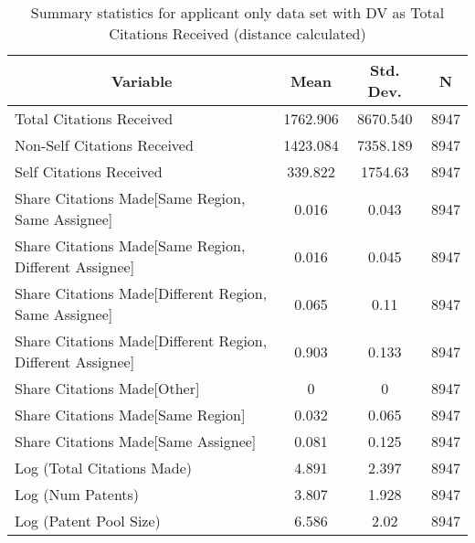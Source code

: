 
\begin{table}[htbp]\centering \caption{Summary statistics for applicant only data set with DV as Total Citations Received (distance calculated) \label{a.tsummary}}
\begin{tabular}{l c c  c}\hline\hline
\multicolumn{1}{c}{\textbf{Variable}} & \textbf{Mean}
 & \textbf{Std. Dev.} & \textbf{N}\\ \hline
Total Citations Received & 1762.906 & 8670.540  & 8947\\
Non-Self Citations Received & 1423.084 & 7358.189  & 8947\\
Self Citations Received & 339.822 & 1754.63  & 8947\\
Share Citations Made[Same Region, Same Assignee] & 0.016 & 0.043  & 8947\\
Share Citations Made[Same Region, Different Assignee] & 0.016 & 0.045  & 8947\\
Share Citations Made[Different Region, Same Assignee] & 0.065 & 0.11  & 8947\\
Share Citations Made[Different Region, Different Assignee] & 0.903 & 0.133  & 8947\\
Share Citations Made[Other] & 0 & 0  & 8947\\
Share Citations Made[Same Region] & 0.032 & 0.065  & 8947\\
Share Citations Made[Same Assignee] & 0.081 & 0.125  & 8947\\
Log (Total Citations Made) & 4.891 & 2.397  & 8947\\
Log (Num Patents) & 3.807 & 1.928  & 8947\\
Log (Patent Pool Size) & 6.586 & 2.02  & 8947\\
\hline\end{tabular}
\end{table}
